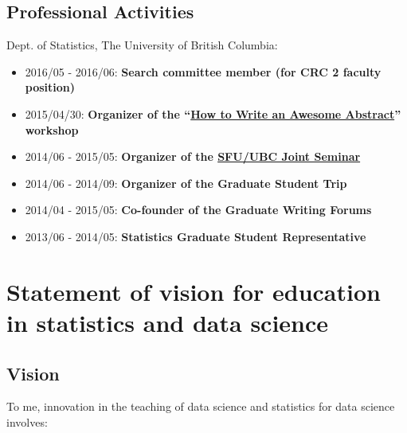 \documentclass[]{book}
\providecommand{\tightlist}{%
  \setlength{\itemsep}{0pt}\setlength{\parskip}{0pt}}
\begin{document}
\hypertarget{professional-activities}{%
\section{Professional Activities}\label{professional-activities}}

Dept. of Statistics, The University of British Columbia:

\begin{itemize}
\tightlist
\item
  2016/05 - 2016/06: \textbf{Search committee member (for CRC 2 faculty position)}
\item
  2015/04/30: \textbf{Organizer of the ``\href{http://stat.ubc.ca/~vincen.coia/abstractworkshop.html}{How to Write an Awesome Abstract}'' workshop}
\item
  2014/06 - 2015/05: \textbf{Organizer of the \href{http://stat.ubc.ca/~vincen.coia/seminar.html}{SFU/UBC Joint Seminar}}
\item
  2014/06 - 2014/09: \textbf{Organizer of the Graduate Student Trip}
\item
  2014/04 - 2015/05: \textbf{Co-founder of the Graduate Writing Forums}
\item
  2013/06 - 2014/05: \textbf{Statistics Graduate Student Representative}
\end{itemize}

\hypertarget{statement-of-vision-for-education-in-statistics-and-data-science}{%
\chapter{Statement of vision for education in statistics and data science}\label{statement-of-vision-for-education-in-statistics-and-data-science}}

\hypertarget{vision}{%
\section{Vision}\label{vision}}

To me, innovation in the teaching of data science and statistics for data science involves:
\end{document}
